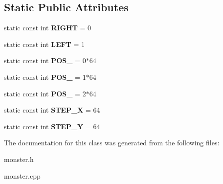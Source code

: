 \subsection*{Static Public Attributes}
\begin{DoxyCompactItemize}
\item 
\mbox{\label{classMonster_aea0c013b4f2be5b8222f2485ab26df34}} 
static const int {\bfseries R\+I\+G\+HT} = 0
\item 
\mbox{\label{classMonster_a331d5024bd00498b20c397d28e8bd252}} 
static const int {\bfseries L\+E\+FT} = 1
\item 
\mbox{\label{classMonster_a06dda6887d97696ecf765123ab63c439}} 
static const int {\bfseries P\+O\+S\+\_} = 0$\ast$64
\item 
\mbox{\label{classMonster_aa9bf136e1d48776e41d959bfeadf4cf5}} 
static const int {\bfseries P\+O\+S\+\_} = 1$\ast$64
\item 
\mbox{\label{classMonster_a3cc28692439a619b0ebb74356ac56852}} 
static const int {\bfseries P\+O\+S\+\_} = 2$\ast$64
\item 
\mbox{\label{classMonster_a66a19a8df7eb83e4514c8f218557c4b5}} 
static const int {\bfseries S\+T\+E\+P\+\_\+X} = 64
\item 
\mbox{\label{classMonster_a63ecb7df06f265ae9e9664cb1216acda}} 
static const int {\bfseries S\+T\+E\+P\+\_\+Y} = 64
\end{DoxyCompactItemize}


The documentation for this class was generated from the following files\+:\begin{DoxyCompactItemize}
\item 
monster.\+h\item 
monster.\+cpp\end{DoxyCompactItemize}
